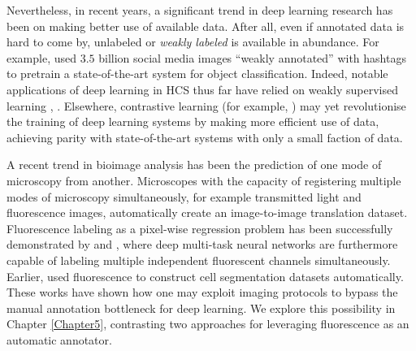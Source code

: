 Nevertheless, in recent years, a significant trend in deep learning research has been on making better use of available data. After all, even if annotated data is hard to come by, unlabeled or \emph{weakly labeled} is available in abundance. For example, \cite{mahajan2018exploring} used $3.5$ billion social media images ``weakly annotated'' with hashtags to pretrain a state-of-the-art system for object classification. Indeed, notable applications of deep learning in HCS thus far have relied on weakly supervised learning \cite{kraus2016classifying}, \cite{godinez2017multi}. Elsewhere, contrastive learning (for example, \cite{chen2020simple}) may yet revolutionise the training of deep learning systems by making more efficient use of data, achieving parity with state-of-the-art systems with only a small faction of data.

A recent trend in bioimage analysis has been the prediction of one mode of microscopy from another. Microscopes with the capacity of registering multiple modes of microscopy simultaneously, for example transmitted light and fluorescence images, automatically create an image-to-image translation dataset. Fluorescence labeling as a pixel-wise regression problem has been successfully demonstrated by \cite{christiansen2018silico} and \cite{ounkomol2018label}, where deep multi-task neural networks are furthermore capable of labeling multiple independent fluorescent channels simultaneously. Earlier, \cite{sadanandan2017automated} used fluorescence to construct cell segmentation datasets automatically. These works have shown how one may exploit imaging protocols to bypass the manual annotation bottleneck for deep learning. We explore this possibility in Chapter \ref{Chapter5}, contrasting two approaches for leveraging fluorescence as an automatic annotator.

